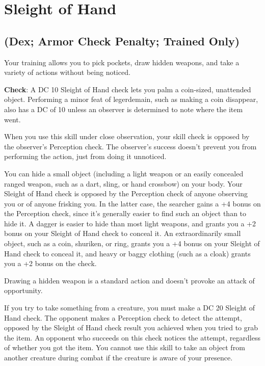 \section{Sleight of Hand}

\label{f0}				
\subsection{(Dex; Armor Check Penalty; Trained Only)}

				
Your training allows you to pick pockets, draw hidden weapons, and take a variety of actions without being noticed.
				
\textbf{Check}: A DC 10 Sleight of Hand check lets you palm a coin-sized, unattended object. Performing a minor feat of legerdemain, such as making a coin disappear, also has a DC of 10 unless an observer is determined to note where the item went.
				
When you use this skill under close observation, your skill check is opposed by the observer's Perception check. The observer's success doesn't prevent you from performing the action, just from doing it unnoticed.
				
You can hide a small object (including a light weapon or an easily concealed ranged weapon, such as a dart, sling, or hand crossbow) on your body. Your Sleight of Hand check is opposed by the Perception check of anyone observing you or of anyone frisking you. In the latter case, the searcher gains a +4 bonus on the Perception check, since it's generally easier to find such an object than to hide it. A dagger is easier to hide than most light weapons, and grants you a +2 bonus on your Sleight of Hand check to conceal it. An extraordinarily small object, such as a coin, shuriken, or ring, grants you a +4 bonus on your Sleight of Hand check to conceal it, and heavy or baggy clothing (such as a cloak) grants you a +2 bonus on the check.
				
Drawing a hidden weapon is a standard action and doesn't provoke an attack of opportunity.
				
If you try to take something from a creature, you must make a DC 20 Sleight of Hand check. The opponent makes a Perception check to detect the attempt, opposed by the Sleight of Hand check result you achieved when you tried to grab the item. An opponent who succeeds on this check notices the attempt, regardless of whether you got the item. You cannot use this skill to take an object from another creature during combat if the creature is aware of your presence.
				
